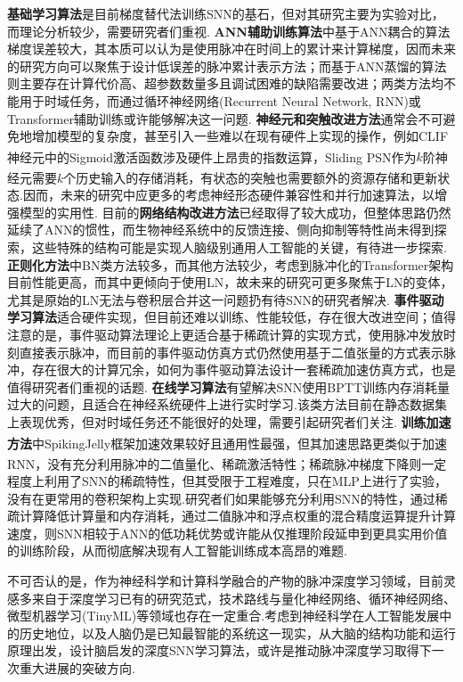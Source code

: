 \documentclass[10.5pt,compsoc,UTF8]{CjC}
\theoremstyle{mystyle}
\newcommand{\upcite}[1]{\textsuperscript{\cite{#1}}}
\begin{document}
\begin{multicols}{1}
\textbf{基础学习算法}是目前梯度替代法训练SNN的基石，但对其研究主要为实验对比，而理论分析较少，需要研究者们重视.
\textbf{ANN辅助训练算法}中基于ANN耦合的算法梯度误差较大，其本质可以认为是使用脉冲在时间上的累计来计算梯度，因而未来的研究方向可以聚焦于设计低误差的脉冲累计表示方法；而基于ANN蒸馏的算法则主要存在计算代价高、超参数数量多且调试困难的缺陷需要改进；两类方法均不能用于时域任务，而通过循环神经网络(Recurrent Neural Network, RNN)或Transformer辅助训练或许能够解决这一问题.
\textbf{神经元和突触改进方法}通常会不可避免地增加模型的复杂度，甚至引入一些难以在现有硬件上实现的操作，例如CLIF神经元\upcite{huang2024clif}中的Sigmoid激活函数涉及硬件上昂贵的指数运算，Sliding PSN\upcite{fang2023parallel}作为$k$阶神经元需要$k$个历史输入的存储消耗，有状态的突触\upcite{SNN-IIR}也需要额外的资源存储和更新状态.因而，未来的研究中应更多的考虑神经形态硬件兼容性和并行加速算法，以增强模型的实用性.
目前的\textbf{网络结构改进方法}已经取得了较大成功，但整体思路仍然延续了ANN的惯性，而生物神经系统中的反馈连接、侧向抑制等特性尚未得到探索，这些特殊的结构可能是实现人脑级别通用人工智能的关键，有待进一步探索.
\textbf{正则化方法}中BN类方法较多，而其他方法较少，考虑到脉冲化的Transformer架构目前性能更高，而其中更倾向于使用LN，故未来的研究可更多聚焦于LN的变体，尤其是原始的LN无法与卷积层合并这一问题扔有待SNN的研究者解决.
\textbf{事件驱动学习算法}适合硬件实现，但目前还难以训练、性能较低，存在很大改进空间；值得注意的是，事件驱动算法理论上更适合基于稀疏计算的实现方式，使用脉冲发放时刻直接表示脉冲，而目前的事件驱动仿真方式仍然使用基于二值张量的方式表示脉冲，存在很大的计算冗余，如何为事件驱动算法设计一套稀疏加速仿真方式，也是值得研究者们重视的话题.
\textbf{在线学习算法}有望解决SNN使用BPTT训练内存消耗量过大的问题，且适合在神经系统硬件上进行实时学习.该类方法目前在静态数据集上表现优秀，但对时域任务还不能很好的处理，需要引起研究者们关注.
\textbf{训练加速方法}中SpikingJelly\upcite{doi:10.1126/sciadv.adi1480}框架加速效果较好且通用性最强，但其加速思路更类似于加速RNN，没有充分利用脉冲的二值量化、稀疏激活特性；稀疏脉冲梯度下降\upcite{perez-nieves2021sparse}则一定程度上利用了SNN的稀疏特性，但其受限于工程难度，只在MLP上进行了实验，没有在更常用的卷积架构上实现.研究者们如果能够充分利用SNN的特性，通过稀疏计算降低计算量和内存消耗，通过二值脉冲和浮点权重的混合精度运算提升计算速度，则SNN相较于ANN的低功耗优势或许能从仅推理阶段延申到更具实用价值的训练阶段，从而彻底解决现有人工智能训练成本高昂的难题.

%

不可否认的是，作为神经科学和计算科学融合的产物的脉冲深度学习领域，目前灵感多来自于深度学习已有的研究范式，技术路线与量化神经网络、循环神经网络、微型机器学习(TinyML)等领域也存在一定重合.考虑到神经科学在人工智能发展中的历史地位，以及人脑仍是已知最智能的系统这一现实，从大脑的结构功能和运行原理出发，设计脑启发的深度SNN学习算法，或许是推动脉冲深度学习取得下一次重大进展的突破方向.


\end{multicols}
\end{document}

